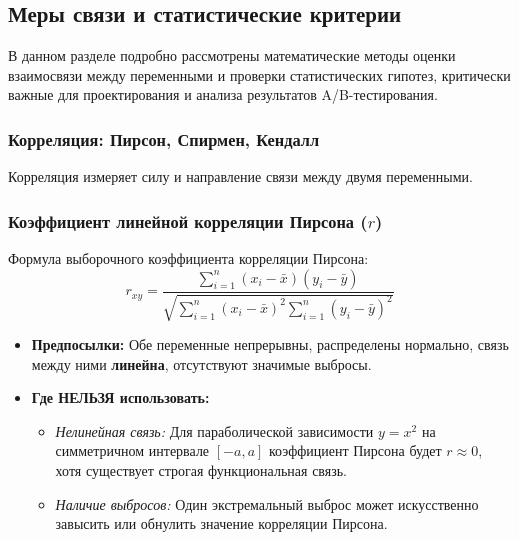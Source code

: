\documentclass[12pt]{article}
\begin{document}
\newpage

\subsection{Меры связи и статистические критерии}

В данном разделе подробно рассмотрены математические методы оценки взаимосвязи между переменными и проверки статистических гипотез, критически важные для проектирования и анализа результатов A/B-тестирования.

\subsubsection{Корреляция: Пирсон, Спирмен, Кендалл}

Корреляция измеряет силу и направление связи между двумя переменными.

\subsubsection{Коэффициент линейной корреляции Пирсона ($r$)}
Формула выборочного коэффициента корреляции Пирсона:
\begin{equation}
    r_{xy} = \frac{\sum_{i=1}^n (x_i - \bar{x})(y_i - \bar{y})}{\sqrt{\sum_{i=1}^n (x_i - \bar{x})^2 \sum_{i=1}^n (y_i - \bar{y})^2}}
\end{equation}
\begin{itemize}
    \item \textbf{Предпосылки:} Обе переменные непрерывны, распределены нормально, связь между ними \textbf{линейна}, отсутствуют значимые выбросы.
    \item \textbf{Где НЕЛЬЗЯ использовать:}
    \begin{itemize}
        \item \textit{Нелинейная связь:} Для параболической зависимости $y = x^2$ на симметричном интервале $[-a, a]$ коэффициент Пирсона будет $r \approx 0$, хотя существует строгая функциональная связь.
        \item \textit{Наличие выбросов:} Один экстремальный выброс может искусственно завысить или обнулить значение корреляции Пирсона.
    \end{itemize}
\end{itemize}
\end{document}
